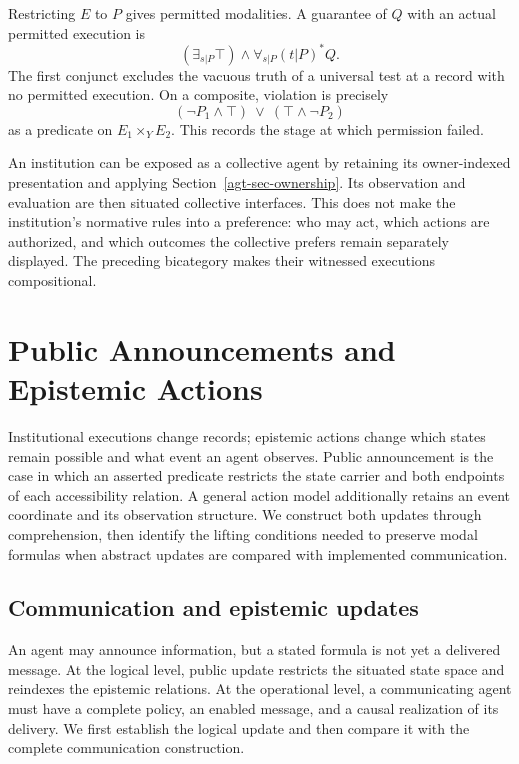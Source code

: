 \documentclass[11pt,a4paper]{article}
\numberwithin{equation}{section}
\theoremstyle{definition}
\theoremstyle{remark}
\theoremstyle{plain}
\begin{document}
Restricting $E$ to $P$ gives permitted modalities. A guarantee of $Q$ with
an actual permitted execution is
\[
 (\exists_{s|P}\top)\wedge\forall_{s|P}(t|P)^*Q.
\]
The first conjunct excludes the vacuous truth of a universal test at a
record with no permitted execution. On a composite, violation is precisely
\[
 (\neg P_1\wedge\top)\ \vee\ (\top\wedge\neg P_2)
\]
as a predicate on $E_1\times_YE_2$. This records the stage at which
permission failed.

An institution can be exposed as a collective agent by retaining its
owner-indexed presentation and applying Section~\ref{agt-sec-ownership}.
Its observation and evaluation are then situated collective interfaces.
This does not make the institution's normative rules into a preference:
who may act, which actions are authorized, and which outcomes the
collective prefers remain separately displayed. The preceding bicategory
makes their witnessed executions compositional.

\section{Public Announcements and Epistemic Actions}\label{sec:paper-9}

Institutional executions change records; epistemic actions change
which states remain possible and what event an agent observes. Public
announcement is the case in which an asserted predicate restricts the
state carrier and both endpoints of each accessibility relation. A
general action model additionally retains an event coordinate and its
observation structure. We construct both updates through comprehension,
then identify the lifting conditions needed to preserve modal formulas
when abstract updates are compared with implemented communication.

\subsection{Communication and epistemic updates}
\label{sec:egt-communication}

An agent may announce information, but a stated formula is not yet
a delivered message. At the logical level, public update restricts the
situated state space and reindexes the epistemic relations. At the
operational level, a communicating agent must have a complete policy,
an enabled message, and a causal realization of its delivery. We first
establish the logical update and then compare it with the complete
communication construction.
\end{document}

